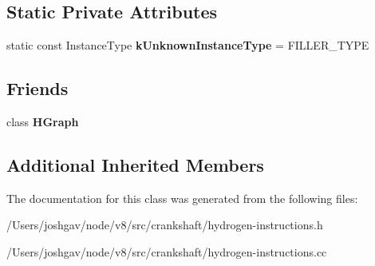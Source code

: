 \subsection*{Static Private Attributes}
\begin{DoxyCompactItemize}
\item 
static const Instance\+Type {\bfseries k\+Unknown\+Instance\+Type} = F\+I\+L\+L\+E\+R\+\_\+\+T\+Y\+PE\hypertarget{classv8_1_1internal_1_1_h_constant_a19b482f836409b0094c40e861dc2e2c5}{}\label{classv8_1_1internal_1_1_h_constant_a19b482f836409b0094c40e861dc2e2c5}

\end{DoxyCompactItemize}
\subsection*{Friends}
\begin{DoxyCompactItemize}
\item 
class {\bfseries H\+Graph}\hypertarget{classv8_1_1internal_1_1_h_constant_aafb6b0d7e2c07dd5b0b599670c46d084}{}\label{classv8_1_1internal_1_1_h_constant_aafb6b0d7e2c07dd5b0b599670c46d084}

\end{DoxyCompactItemize}
\subsection*{Additional Inherited Members}


The documentation for this class was generated from the following files\+:\begin{DoxyCompactItemize}
\item 
/\+Users/joshgav/node/v8/src/crankshaft/hydrogen-\/instructions.\+h\item 
/\+Users/joshgav/node/v8/src/crankshaft/hydrogen-\/instructions.\+cc\end{DoxyCompactItemize}

